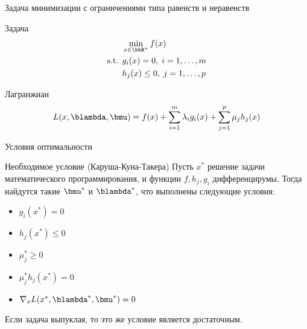\documentclass[12pt]{beamer}
\begin{document}
\begin{frame}{{Задача минимизации с ограничениями типа равенств и неравенств}}

\begin{block}{Задача}
\vspace{-5mm}
\begin{equation*}
\begin{split}
& \min\limits_{x \in \bbR^n} f(x)\\
\text{s.t. } & g_i(x) = 0, \; i = 1,\ldots,m\\
& h_j(x) \leq 0, \; j = 1,\ldots, p
\end{split}
\end{equation*}
\end{block}

\begin{block}{Лагранжиан}
\begin{equation*}
L(x, \blambda, \bmu) = f(x) + \sum\limits_{i=1}^m\lambda_i g_i(x) + \sum\limits_{j=1}^p \mu_j h_j(x)
\end{equation*}
\end{block}
\end{frame}

\begin{frame}{Условия оптимальности}
\begin{block}{Необходимое условие (Каруша-Куна-Такера)}
Пусть $x^*$ решение задачи математического программирования, и функции $f, h_j, g_i$ дифференцирумы. 
Тогда найдутся такие $\bmu^*$ и $\blambda^*$, что выполнены следующие условия:
\begin{itemize}
\item $g_i(x^*) = 0$
\item $h_j(x^*) \leq 0$
\item $ \mu^*_j \geq 0$
\item $\mu^*_jh_j(x^*) = 0$
\item $\nabla_x L(x^*, \blambda^*, \bmu^*) = 0$
\end{itemize}
\end{block}
Если задача выпуклая, то это же условие является достаточным.
\end{frame}
\end{document}

